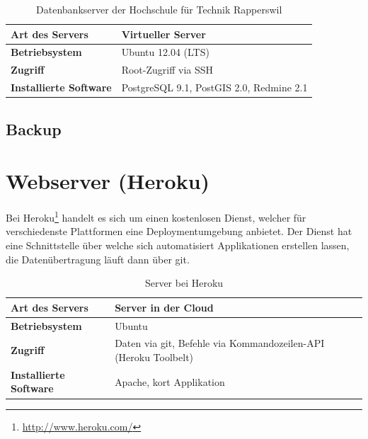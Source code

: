 \begin{table}[H]
\centering
\begin{tabular}{|p{0.25\twocelltabwidth}|p{0.75\twocelltabwidth}|}
\hline 
\small{\textbf{Art des Servers}} & Virtueller Server \\
\hline 
\small{\textbf{Betriebsystem}} & Ubuntu 12.04 (LTS) \\
\hline 
\small{\textbf{Zugriff}} & Root-Zugriff via SSH \\
\hline 
\small{\textbf{Installierte Software}} & PostgreSQL 9.1, PostGIS 2.0, Redmine 2.1 \\
\hline 
\end{tabular} 
\caption{Datenbankserver der Hochschule für Technik Rapperswil}
\label{infrastruktur-datenbankserver-tabelle}
\end{table}

\subsection{Backup}

\section{Webserver (Heroku)}

Bei Heroku\footnote{\url{http://www.heroku.com/}} handelt es sich um einen kostenlosen Dienst, welcher für verschiedenste Plattformen eine Deploymentumgebung anbietet. 
Der Dienst hat eine Schnittstelle über welche sich automatisiert Applikationen erstellen lassen, die Datenübertragung läuft dann über \gls{git}.

\begin{table}[H]
\centering
\begin{tabular}{|p{0.25\twocelltabwidth}|p{0.75\twocelltabwidth}|}
\hline 
\small{\textbf{Art des Servers}} & Server in der \gls{Cloud} \\
\hline 
\small{\textbf{Betriebsystem}} & Ubuntu \\
\hline 
\small{\textbf{Zugriff}} & Daten via \gls{git}, Befehle via Kommandozeilen-API (Heroku Toolbelt) \\
\hline 
\small{\textbf{Installierte Software}} & Apache, kort Applikation \\
\hline 
\end{tabular} 
\caption{Server bei Heroku}
\label{infrastruktur-heroku-tabelle}
\end{table}

